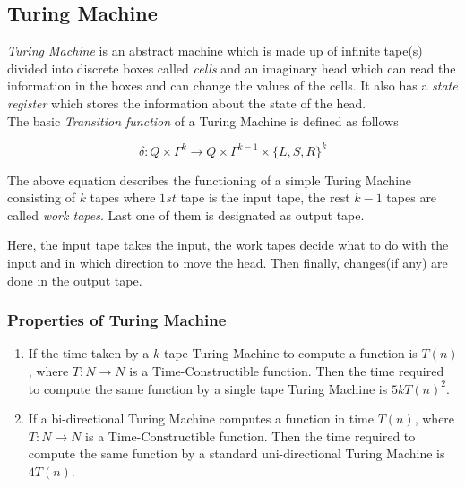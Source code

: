 \documentclass[12pt,a4paper]{extarticle}
\begin{document}
\subsection{Turing Machine}
\textit{Turing Machine} is an abstract machine which is made up of infinite tape(s) divided into discrete boxes called \textit{cells} and an imaginary head which can read the information in the boxes and can change the values of the cells. It also has a \textit{state register} which stores the information about the state of the head.\\
The basic \textit{Transition function} of a Turing Machine is defined as follows

\begin{equation}
\delta:Q\times\Gamma^k\longrightarrow Q\times\Gamma^{k-1}\times\{L,S,R\}^k
\end{equation}  

The above equation describes the functioning of a simple Turing Machine consisting of $k$ tapes where $1st$ tape is the input tape, the rest $k-1$ tapes are called \textit{work tapes}. Last one of them is designated as output tape.\par
Here, the input tape takes the input, the work tapes decide what to do with the input and in which direction to move the head. Then finally, changes(if any) are done in the output tape.\par
 
\subsubsection{Properties of Turing Machine} 
\begin{enumerate}
 \item If the time taken by a $k$ tape Turing Machine to compute a function is $T(n)$, where $T:N\rightarrow N$ is a Time-Constructible function. Then the time required to compute the same function by a single tape Turing Machine is $5kT(n)^2$.
 
 \newpage
 
 \item If a bi-directional Turing Machine computes a function in time $T(n)$, where $T:N\rightarrow N$ is a Time-Constructible function. Then the time required to compute the same function by a standard uni-directional Turing Machine is $4T(n)$.
\end{enumerate}
\end{document}
